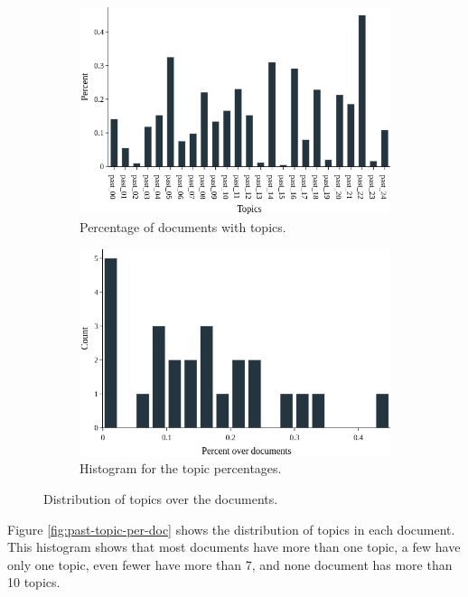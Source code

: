 \begin{figure}[h!]
	\begin{subfigure}{0.49\textwidth}
		\includegraphics[width=\linewidth]{01.Chapters/05.Results/past-percentage-bar}
		\caption{Percentage of documents with topics.}
		\label{fig:past-percentage-bar}
	\end{subfigure}%
	\hfill
	\begin{subfigure}{0.49\textwidth}
		\includegraphics[width=\linewidth]{01.Chapters/05.Results/past-percentage-hist}
		\caption{Histogram for the topic percentages.}
		\label{fig:past-percentage-hist}
	\end{subfigure}%
	\caption{Distribution of topics over the documents.}
	\label{fig:past-topic-dist}
\end{figure}

Figure \ref{fig:past-topic-per-doc} shows the distribution of topics in each document. This histogram shows that most documents have more than one topic, a few have only one topic, even fewer have more than 7, and none document has more than 10 topics.

